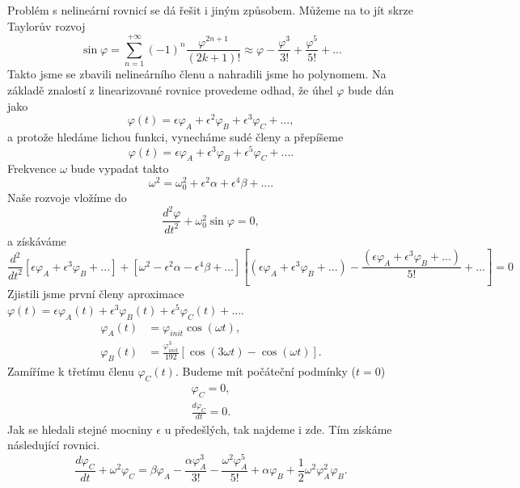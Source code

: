 Problém s nelineární rovnicí se dá řešit i jiným způsobem. Můžeme na to jít skrze Taylorův rozvoj
\begin{equation}
\sin\varphi=\sum_{n=1}^{+\infty}(-1)^n\frac{\varphi^{2n+1}}{(2k+1)!}\approx\varphi-\frac{\varphi^3}{3!}+\frac{\varphi^5}{5!}+...
\end{equation}
Takto jsme se zbavili nelineárního členu a nahradili jsme ho polynomem. Na základě znalostí z linearizované rovnice provedeme odhad, že úhel $\varphi$ bude dán jako
\begin{equation}
\varphi(t)=\epsilon\varphi_A + \epsilon^2\varphi_B +\epsilon^3\varphi_C+...,
\end{equation}
a protože hledáme lichou funkci, vynecháme sudé členy a přepíšeme
\begin{equation}
\varphi(t)=\epsilon\varphi_A + \epsilon^3\varphi_B +\epsilon^5\varphi_C+....
\end{equation}
Frekvence $\omega$ bude vypadat takto
\begin{equation}
\omega^2=\omega_0^2+\epsilon^2\alpha+\epsilon^4\beta+....
\end{equation}
Naše rozvoje vložíme do
\begin{equation}
\frac{d^2\varphi}{dt^2}+\omega_0^2\sin\varphi=0,
\end{equation}
a získáváme
\begin{equation}
\frac{d^2}{dt^2}[\epsilon\varphi_A + \epsilon^3\varphi_B +...]+[\omega^2-\epsilon^2\alpha-\epsilon^4\beta+...]\left[(\epsilon\varphi_A + \epsilon^3\varphi_B +...)-\frac{(\epsilon\varphi_A + \epsilon^3\varphi_B +...)}{5!}+...\right]=0
\end{equation}
Zjistili jsme první členy aproximace $\varphi(t)=\epsilon\varphi_A(t) +\epsilon^3\varphi_B(t)+\epsilon^5\varphi_C(t)+...$.
\begin{align}
\varphi_A(t)&= \varphi_{init}\cos(\omega t),\\
\varphi_B(t)&=\frac{\varphi_{init}^3}{192}[\cos(3\omega t)-\cos(\omega t)].
\end{align}
Zamíříme k třetímu členu $\varphi_C(t)$. Budeme mít počáteční podmínky ($t=0$)
\begin{align}
\varphi_C = 0,\\
\frac{d\varphi_C}{dt}=0.
\end{align}
Jak se hledali stejné mocniny $\epsilon$ u předešlých, tak najdeme i zde. Tím získáme následující rovnici.
\begin{equation}
\frac{d\varphi_C}{dt}+\omega^2\varphi_C=\beta\varphi_A-\frac{\alpha\varphi_A^3}{3!}-\frac{\omega^2\varphi_A^5}{5!}+\alpha\varphi_B+\frac{1}{2}\omega^2\varphi_A^2\varphi_B.
\end{equation}
